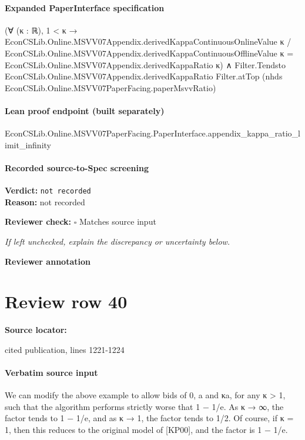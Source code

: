 \documentclass[10pt]{article}
\newcommand{\reviewerbox}{%
  \par\noindent\fbox{\parbox{0.96\linewidth}{\rule{0pt}{0.38in}}}\par
}
\newcommand{\reviewmatch}[1]{%
  \par\noindent\textbf{Reviewer check:} $\square$\; #1\par
  \noindent\emph{If left unchecked, explain the discrepancy or uncertainty below.}\par
}
\begin{document}
\paragraph{Expanded PaperInterface specification}
\begin{ReviewVerbatim}
(∀ (κ : ℝ),
    1 < κ →
      EconCSLib.Online.MSVV07Appendix.derivedKappaContinuousOnlineValue κ /
          EconCSLib.Online.MSVV07Appendix.derivedKappaContinuousOfflineValue κ =
        EconCSLib.Online.MSVV07Appendix.derivedKappaRatio κ) ∧
  Filter.Tendsto EconCSLib.Online.MSVV07Appendix.derivedKappaRatio Filter.atTop
    (nhds EconCSLib.Online.MSVV07PaperFacing.paperMsvvRatio)
\end{ReviewVerbatim}

\paragraph{Lean proof endpoint (built separately)}\begin{ReviewVerbatim}
EconCSLib.Online.MSVV07PaperFacing.PaperInterface.appendix_kappa_ratio_limit_infinity
\end{ReviewVerbatim}

\paragraph{Recorded source-to-Spec screening}
\textbf{Verdict:} \texttt{not recorded}
\\
\textbf{Reason:} not recorded
\reviewmatch{Matches source input}
\noindent\textbf{Reviewer annotation}\par
\reviewerbox
\clearpage
\hypertarget{source-claim-f078540b43b64d98}{}
\section*{Review row 40}
\textbf{Source locator:} {\footnotesize\raggedright cited publication, lines 1221-\allowbreak{}1224\par}
\paragraph{Verbatim source input}
\begin{ReviewVerbatim}
We can modify the above example to allow bids of 0, a and κa, for any κ > 1, such that the
algorithm performs strictly worse that 1 − 1/e.
As κ → ∞, the factor tends to 1 − 1/e, and as κ → 1, the factor tends to 1/2. Of course, if
κ = 1, then this reduces to the original model of [KP00], and the factor is 1 − 1/e.
\end{ReviewVerbatim}
\end{document}
